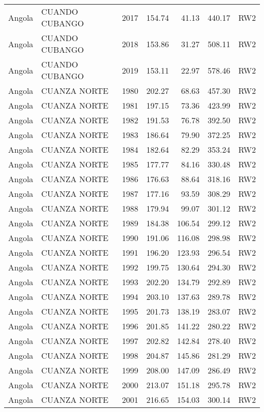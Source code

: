 \begin{longtable}{lllrrrl}
  Angola & CUANDO CUBANGO & 2017 & 154.74 & 41.13 & 440.17 & RW2 \\ 
  Angola & CUANDO CUBANGO & 2018 & 153.86 & 31.27 & 508.11 & RW2 \\ 
  Angola & CUANDO CUBANGO & 2019 & 153.11 & 22.97 & 578.46 & RW2 \\ 
  Angola & CUANZA NORTE & 1980 & 202.27 & 68.63 & 457.30 & RW2 \\ 
  Angola & CUANZA NORTE & 1981 & 197.15 & 73.36 & 423.99 & RW2 \\ 
  Angola & CUANZA NORTE & 1982 & 191.53 & 76.78 & 392.50 & RW2 \\ 
  Angola & CUANZA NORTE & 1983 & 186.64 & 79.90 & 372.25 & RW2 \\ 
  Angola & CUANZA NORTE & 1984 & 182.64 & 82.29 & 353.24 & RW2 \\ 
  Angola & CUANZA NORTE & 1985 & 177.77 & 84.16 & 330.48 & RW2 \\ 
  Angola & CUANZA NORTE & 1986 & 176.63 & 88.64 & 318.16 & RW2 \\ 
  Angola & CUANZA NORTE & 1987 & 177.16 & 93.59 & 308.29 & RW2 \\ 
  Angola & CUANZA NORTE & 1988 & 179.94 & 99.07 & 301.12 & RW2 \\ 
  Angola & CUANZA NORTE & 1989 & 184.38 & 106.54 & 299.12 & RW2 \\ 
  Angola & CUANZA NORTE & 1990 & 191.06 & 116.08 & 298.98 & RW2 \\ 
  Angola & CUANZA NORTE & 1991 & 196.20 & 123.93 & 296.54 & RW2 \\ 
  Angola & CUANZA NORTE & 1992 & 199.75 & 130.64 & 294.30 & RW2 \\ 
  Angola & CUANZA NORTE & 1993 & 202.20 & 134.79 & 292.89 & RW2 \\ 
  Angola & CUANZA NORTE & 1994 & 203.10 & 137.63 & 289.78 & RW2 \\ 
  Angola & CUANZA NORTE & 1995 & 201.73 & 138.19 & 283.07 & RW2 \\ 
  Angola & CUANZA NORTE & 1996 & 201.85 & 141.22 & 280.22 & RW2 \\ 
  Angola & CUANZA NORTE & 1997 & 202.82 & 142.84 & 278.40 & RW2 \\ 
  Angola & CUANZA NORTE & 1998 & 204.87 & 145.86 & 281.29 & RW2 \\ 
  Angola & CUANZA NORTE & 1999 & 208.00 & 147.09 & 286.49 & RW2 \\ 
  Angola & CUANZA NORTE & 2000 & 213.07 & 151.18 & 295.78 & RW2 \\ 
  Angola & CUANZA NORTE & 2001 & 216.65 & 154.03 & 300.14 & RW2 \\ 

\end{longtable}

